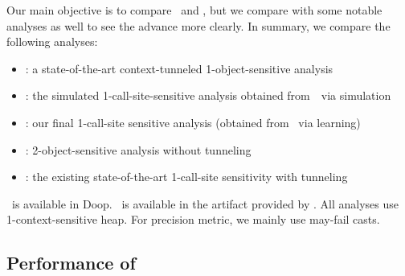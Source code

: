 Our main objective is to compare \oneobjHT~and
\ours, but we compare with some notable analyses as well to
see the advance more clearly. In summary, we compare the following
 analyses:
\begin{itemize}[leftmargin=1.3em]
\item \oneobjHT: a state-of-the-art context-tunneled 1-object-sensitive analysis~\cite{JeJeOh18}
\item \oursim: the simulated 1-call-site-sensitive analysis
    obtained from~\oneobjHT~via 
    simulation%
\item \ours: our final 1-call-site sensitive analysis
  (obtained from \oursim~via learning)
\item \twoobjH: 2-object-sensitive analysis without
  tunneling~\cite{Smaragdakis2011}
\item \onecallHT: the existing state-of-the-art 1-call-site sensitivity with
  tunneling~\cite{JeJeOh18}
\end{itemize}
\twoobjH~is available in Doop. 
\onecallHT~is available in the artifact provided by \cite{JeJeOh18}. 
All analyses use 1-context-sensitive heap.
For precision metric, we mainly use may-fail
casts. %









\subsection{Performance of \ours}\label{sec:performance}


